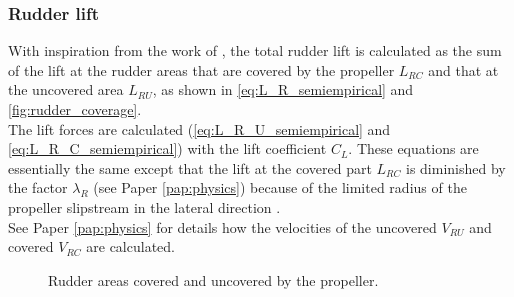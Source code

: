 \subsubsection{Rudder lift}
\label{sec:rudder lift}
With inspiration from the work of \textcite{villaNumericalAnalysisRudder2020}, the total rudder lift is calculated as the sum of the lift at the rudder areas that are covered by the propeller $L_{RC}$ and that at the uncovered area $L_{RU}$, as shown in \autoref{eq:L_R_semiempirical} and \autoref{fig:rudder_coverage}.
\begin{equation}
    \label{eq:L_R_semiempirical}
    
\end{equation}
The lift forces are calculated (\autoref{eq:L_R_U_semiempirical} and \autoref{eq:L_R_C_semiempirical}) with the lift coefficient $C_L$. These equations are essentially the same except that the lift at the covered part $L_{RC}$ is diminished by the factor $\lambda_R$ (see Paper \ref{pap:physics}) because of the limited radius of the propeller slipstream in the lateral direction \cite{brixManoeuvringTechnicalManual1993}.
\begin{equation}
    \label{eq:L_R_U_semiempirical}
    
\end{equation}
%
\begin{equation}
    \label{eq:L_R_C_semiempirical}
    
\end{equation}
See Paper \ref{pap:physics}  for details how the velocities of the uncovered $V_{RU}$ and covered $V_{RC}$ are calculated. 
\begin{figure}[h]
    \centering
    
    \caption{Rudder areas covered and uncovered by the propeller.}
    \label{fig:rudder_coverage}
\end{figure}

